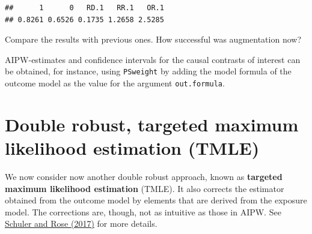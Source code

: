 \documentclass[
]{book}
\newenvironment{Shaded}{\begin{snugshade}}{\end{snugshade}}
\newcommand{\DecValTok}[1]{\textcolor[rgb]{0.00,0.00,0.81}{#1}}
\newcommand{\FunctionTok}[1]{\textcolor[rgb]{0.13,0.29,0.53}{\textbf{#1}}}
\newcommand{\NormalTok}[1]{#1}
\newcommand{\OtherTok}[1]{\textcolor[rgb]{0.56,0.35,0.01}{#1}}
\newcommand{\SpecialCharTok}[1]{\textcolor[rgb]{0.81,0.36,0.00}{\textbf{#1}}}
\begin{document}
\begin{Shaded}
\end{Shaded}

\begin{verbatim}
##      1      0   RD.1   RR.1   OR.1 
## 0.8261 0.6526 0.1735 1.2658 2.5285
\end{verbatim}

Compare the results with previous ones.
How successful was augmentation now?

AIPW-estimates and confidence
intervals for the causal contrasts of interest can
be obtained, for instance, using \texttt{PSweight} by adding
the model formula of the outcome model
as the value for the argument \texttt{out.formula}.

\section{Double robust, targeted maximum likelihood estimation (TMLE)}\label{double-robust-targeted-maximum-likelihood-estimation-tmle}

We now consider now another double robust approach,
known as \textbf{targeted
maximum likelihood estimation} (TMLE).
It also corrects the estimator
obtained from the outcome model by elements that are derived from the exposure model. The corrections are, though, not as
intuitive as those in AIPW. See \href{https://doi.org/10.1093/aje/kww165}{Schuler and Rose
(2017)} for more details.
\end{document}
